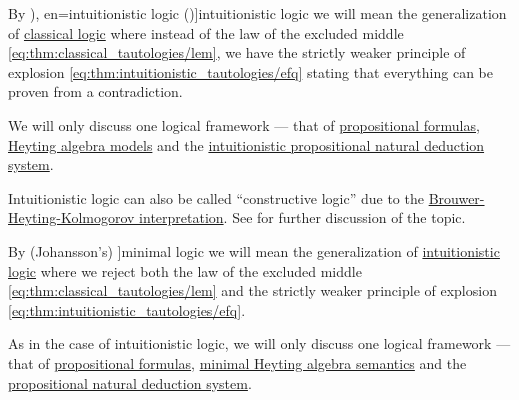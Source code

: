 \begin{definition}\label{def:intuitionistic_logic}\mimprovised
  By \term[ru=интуиционисткая логика (\cite[58]{ШеньВерещагин2017Языки}), en=intuitionistic logic (\cite[8]{TroelstraSchwichtenberg2000})]{intuitionistic logic} we will mean the generalization of \hyperref[def:classical_logic]{classical logic} where instead of the law of the excluded middle \eqref{eq:thm:classical_tautologies/lem}, we have the strictly weaker principle of explosion \eqref{eq:thm:intuitionistic_tautologies/efq} stating that everything can be proven from a contradiction.

  We will only discuss one logical framework --- that of \hyperref[def:propositional_syntax/formula]{propositional formulas}, \hyperref[def:propositional_heyting_algebra_semantics]{Heyting algebra models} and the \hyperref[def:intuitionistic_propositional_deduction_systems]{intuitionistic propositional natural deduction system}.
\end{definition}
\begin{comments}
  \item Intuitionistic logic can also be called \enquote{constructive logic} due to the \hyperref[con:brouwer_heyting_kolmogorov_interpretation]{Brouwer-Heyting-Kolmogorov interpretation}. See  for further discussion of the topic.
\end{comments}

\begin{definition}\label{def:minimal_logic}\mimprovised
  By (Johansson's) \term[en=minimal logic (\cite[1]{VanDerMolen2016}]{minimal logic} we will mean the generalization of \hyperref[def:intuitionistic_logic]{intuitionistic logic} where we reject both the law of the excluded middle \eqref{eq:thm:classical_tautologies/lem} and the strictly weaker principle of explosion \eqref{eq:thm:intuitionistic_tautologies/efq}.

  As in the case of intuitionistic logic, we will only discuss one logical framework --- that of \hyperref[def:propositional_syntax/formula]{propositional formulas}, \hyperref[def:minimal_propositional_semantics]{minimal Heyting algebra semantics} and the \hyperref[def:minimal_natural_deduction_system]{propositional natural deduction system}.
\end{definition}
